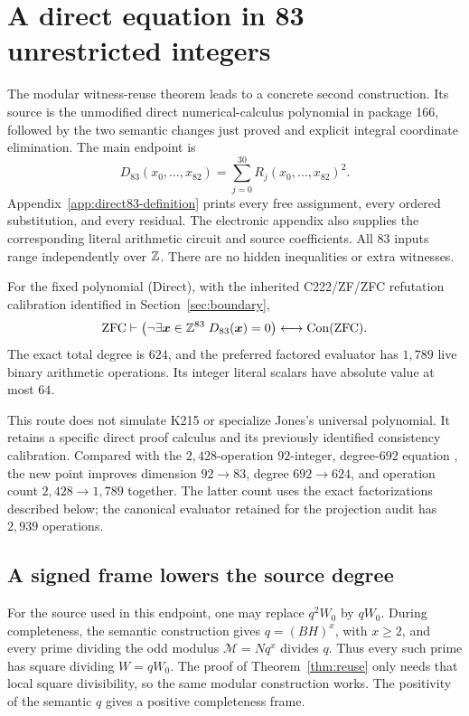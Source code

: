\section{A direct equation in 83 unrestricted integers}\label{sec:direct-results}

The modular witness-reuse theorem leads to a concrete second construction.
Its source is the unmodified direct numerical-calculus polynomial in
package 166, followed by the two semantic changes just proved and explicit
integral coordinate elimination. The main endpoint is
\[
 D_{83}(x_0,\ldots,x_{82})
       =\sum_{j=0}^{30}R_j(x_0,\ldots,x_{82})^2.
 \tag{Direct}
\]
Appendix~\ref{app:direct83-definition} prints every free assignment, every
ordered substitution, and every residual. The electronic appendix also
supplies the corresponding literal arithmetic circuit and source coefficients.
All \(83\) inputs range independently over \(\mathbb Z\).
There are no hidden inequalities or extra witnesses.

\begin{theorem}\label{thm:direct}
For the fixed polynomial (Direct), with the inherited C222/ZF/ZFC
refutation calibration identified in Section~\ref{sec:boundary},
\[
 \mathrm{ZFC}\vdash
 \left(\neg\exists\boldsymbol x\in\mathbb Z^{83}\;D_{83}(\boldsymbol x)=0\right)
       \longleftrightarrow\operatorname{Con}(\mathrm{ZFC}).
\]
The exact total degree is \(624\), and the preferred factored evaluator has
\(1{,}789\) live binary arithmetic operations. Its integer literal scalars
have absolute value at most \(64\).
\end{theorem}

This route does not simulate K215 or specialize Jones's universal
polynomial. It retains a specific direct proof calculus and its previously
identified consistency calibration. Compared with the \(2{,}428\)-operation \(92\)-integer, degree-\(692\) equation
\cite{source175}, the new point improves dimension \(92\to83\), degree
\(692\to624\), and operation count \(2{,}428\to1{,}789\) together.
The latter count uses the exact factorizations described below; the
canonical evaluator retained for the projection audit has \(2{,}939\) operations.

\subsection{A signed frame lowers the source degree}

For the source used in this endpoint, one may replace \(q^2W_0\) by
\(qW_0\). During completeness, the semantic construction gives
\(q=(BH)^x\), with \(x\ge2\), and every prime dividing the odd modulus
\(\mathcal M=Nq^x\) divides \(q\). Thus every such prime has square
dividing \(W=qW_0\). The proof of Theorem~\ref{thm:reuse} only needs
that local square divisibility, so the same modular construction works.
The positivity of the semantic \(q\) gives a positive completeness frame.

